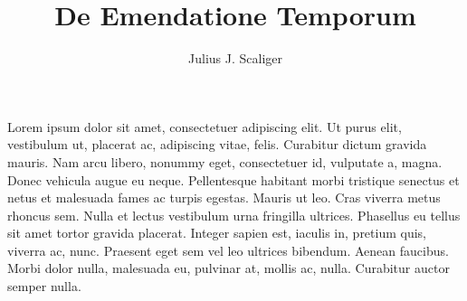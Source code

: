 \documentclass[draft,12pt,twoside,a4paper]{book}
\newcommand{\setheaders}[2]{%
\markboth{\sc{\hfill{}#1\hfill}}{\sc{\hfill{}#2\hfill}}%
}
\begin{document}
\title{De Emendatione Temporum}
\author{Julius J. Scaliger}
\pagestyle{myheadings}
\setheaders{}{}

Lorem ipsum dolor sit amet, consectetuer adipiscing elit.
Ut purus elit, vestibulum ut, placerat ac, adipiscing vitae, felis.
Curabitur dictum gravida mauris.
Nam arcu libero, nonummy eget, consectetuer id, vulputate a, magna.
Donec vehicula augue eu neque.
Pellentesque habitant morbi tristique senectus et netus et malesuada
 fames ac turpis egestas.
Mauris ut leo.
Cras viverra metus rhoncus sem.
Nulla et lectus vestibulum urna fringilla ultrices.
Phasellus eu tellus sit amet tortor gravida placerat.
Integer sapien est, iaculis in, pretium quis, viverra ac, nunc.
Praesent eget sem vel leo ultrices bibendum.
Aenean faucibus.
Morbi dolor nulla, malesuada eu, pulvinar at, mollis ac, nulla.
Curabitur auctor semper nulla.
\end{document}

